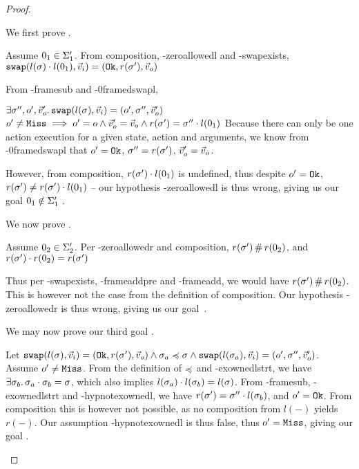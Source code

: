 \begin{proof}
\begin{goalvlist}
\end{goalvlist}



We first prove .

\begin{hypvlist}
	 Assume $0_1\in \Sigma_1'$.
	 From composition, \hyp{zeroallowedl} and \hyp{swapexists}, $\texttt{swap}(l(\sigma)\cdot l(0_1),\vec{v}_i)=(\texttt{Ok},r(\sigma'),\vec{v}_o)$ 
\end{hypvlist}

From \hyp{framesub} and \hyp{0framedswapl},
\begin{hypvlist}
	 $\exists \sigma'', o', \vec{v}_o'\ldotp \texttt{swap}(l(\sigma),\vec{v}_i)=(o', \sigma'', \vec{v}_o')$
	 $o' \neq \texttt{Miss} \implies o' = o \land  \vec{v}_o' = \vec{v}_o \land r(\sigma') = \sigma'' \cdot l(0_1)$
	 Because there can only be one action execution for a given state, action and arguments, we know from \hyp{0framedswapl} that $o'=\texttt{Ok}$, $\sigma''=r(\sigma')$, $\vec{v}_o'=\vec{v}_o$.
\end{hypvlist}

However, from composition, $r(\sigma')\cdot l(0_1)$ is undefined, thus despite $o'=\texttt{Ok}$, $r(\sigma')\neq r(\sigma')\cdot l(0_1)$ -- our hypothesis \hyp{zeroallowedl} is thus wrong, giving us our goal $0_1\notin \Sigma_1'$ .


We now prove .

\begin{hypvlist}
	 Assume $0_2\in \Sigma_2'$.
	 Per \hyp{zeroallowedr} and composition, $r(\sigma')\operatorname{\#} r(0_2)$, and $r(\sigma')\cdot r(0_2)= r(\sigma')$
\end{hypvlist}

Thus per \hyp{swapexists}, \hyp{frameaddpre} and \hyp{frameadd}, we would have $r(\sigma')\operatorname{\#} r(0_2)$. This is however not the case from the definition of composition. Our hypothesis \hyp{zeroallowedr} is thus wrong, giving us our goal~.



We may now prove our third goal .

\begin{hypvlist}
	 Let $\texttt{swap}(l(\sigma),\vec{v}_i)=(\texttt{Ok},r(\sigma'),\vec{v}_o) \land \sigma_a\preccurlyeq\sigma \land \texttt{swap}(l(\sigma_a),\vec{v}_i)=(o',\sigma'',\vec{v}_o')$.%
	 Assume $o'\neq\texttt{Miss}$.
	 From the definition of $\preccurlyeq$ and \hyp{exownedlstrt}, we have $\exists \sigma_b\ldotp \sigma_a\cdot\sigma_b=\sigma$, which also implies $l(\sigma_a)\cdot l(\sigma_b) = l(\sigma)$.
	 From \hyp{framesub}, \hyp{exownedlstrt} and \hyp{hypnotexownedl}, we have $r(\sigma')=\sigma''\cdot l(\sigma_b)$, and $o'=\texttt{Ok}$. From composition this is however not possible, as no composition from $l(-)$ yields $r(-)$. Our assumption \hyp{hypnotexownedl} is thus false, thus $o'=\texttt{Miss}$, giving our goal .
\end{hypvlist}



\end{proof}
